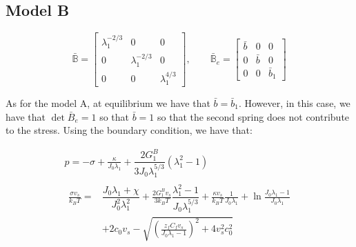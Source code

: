 \documentclass[runningheads]{llncs}
\newcommand{\B}{\ensuremath{\mathbb{B}}}
\begin{document}
\subsection{Model B}
\begin{equation}
\bar{\B}=\begin{bmatrix}
\lambda_1^{-2/3} &0&0\\
0&\lambda_1^{-2/3}&0\\
0&0& \lambda_1^{4/3}
\end{bmatrix}, \qquad
\bar{\B}_e=\begin{bmatrix}
\bar{b} &0&0\\
0&\bar{b}&0\\
0&0& \bar{b}_1
\end{bmatrix}
\end{equation}

As for the model A, at equilibrium we have that $\bar{b}=\bar{b}_1$. However, in this case, we have that $\det \bar{B}_e=1$ so that $\bar{b}=1$ so that the second spring does not contribute to the stress. Using the boundary condition, we have that:

\begin{gather}
\displaystyle 
p = -\sigma + \frac{\kappa}{J_0\lambda_1}+\dfrac{2G^B_1}{3J_0\lambda_1^{5/3}} (\lambda_1^2-1) \\
\begin{aligned}
\frac{\sigma v_s}{k_B T}=&\dfrac{J_0\lambda_1+\chi}{J_0^2\lambda^2_1}+\frac{2G_1^Bv_s}{3k_BT} \dfrac{\lambda^2_1-1}{J_0 \lambda_1^{5/3}}+\frac{\kappa v_s}{k_BT} \frac{1}{J_0 \lambda_1}+\ln \frac{J_0\lambda_1-1}{J_0\lambda_1}\\[1.5mm]
& +2c_0v_s-\sqrt{\left(\frac{z_fC_fv_s}{J_0\lambda_1-1}\right)^2+4v_s^2c^2_0}
\end{aligned}
\end{gather}
\end{document}
